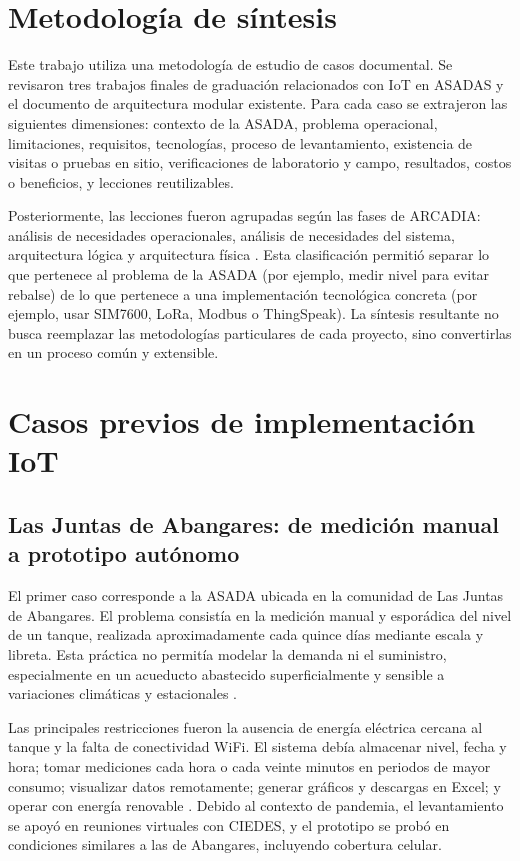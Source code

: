 \documentclass[conference]{IEEEtran}
\begin{document}
\section{Metodología de síntesis}
Este trabajo utiliza una metodología de estudio de casos documental. Se revisaron tres trabajos finales de graduación relacionados con IoT en ASADAS y el documento de arquitectura modular existente. Para cada caso se extrajeron las siguientes dimensiones: contexto de la ASADA, problema operacional, limitaciones, requisitos, tecnologías, proceso de levantamiento, existencia de visitas o pruebas en sitio, verificaciones de laboratorio y campo, resultados, costos o beneficios, y lecciones reutilizables.

Posteriormente, las lecciones fueron agrupadas según las fases de ARCADIA: análisis de necesidades operacionales, análisis de necesidades del sistema, arquitectura lógica y arquitectura física \cite{arcadia,Roques2018}. Esta clasificación permitió separar lo que pertenece al problema de la ASADA (por ejemplo, medir nivel para evitar rebalse) de lo que pertenece a una implementación tecnológica concreta (por ejemplo, usar SIM7600, LoRa, Modbus o ThingSpeak). La síntesis resultante no busca reemplazar las metodologías particulares de cada proyecto, sino convertirlas en un proceso común y extensible.

\section{Casos previos de implementación IoT}

\subsection{Las Juntas de Abangares: de medición manual a prototipo autónomo}
El primer caso corresponde a la ASADA ubicada en la comunidad de Las Juntas de Abangares. El problema consistía en la medición manual y esporádica del nivel de un tanque, realizada aproximadamente cada quince días mediante escala y libreta. Esta práctica no permitía modelar la demanda ni el suministro, especialmente en un acueducto abastecido superficialmente y sensible a variaciones climáticas y estacionales \cite{Chavarria2021}.

Las principales restricciones fueron la ausencia de energía eléctrica cercana al tanque y la falta de conectividad WiFi. El sistema debía almacenar nivel, fecha y hora; tomar mediciones cada hora o cada veinte minutos en periodos de mayor consumo; visualizar datos remotamente; generar gráficos y descargas en Excel; y operar con energía renovable \cite{Chavarria2021}. Debido al contexto de pandemia, el levantamiento se apoyó en reuniones virtuales con CIEDES, y el prototipo se probó en condiciones similares a las de Abangares, incluyendo cobertura celular.
\end{document}
